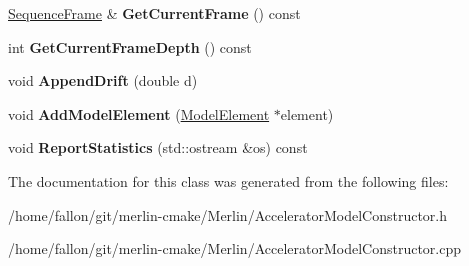 \begin{DoxyCompactItemize}
\item 
\mbox{\label{classAcceleratorModelConstructor_afe1516820679d7d820f264ee0740921f}} 
\hyperlink{classSequenceFrame}{Sequence\+Frame} \& {\bfseries Get\+Current\+Frame} () const
\item 
\mbox{\label{classAcceleratorModelConstructor_a86180838de0ec075c0a009da4ba3535c}} 
int {\bfseries Get\+Current\+Frame\+Depth} () const
\item 
\mbox{\label{classAcceleratorModelConstructor_a6c138a047f21536500eae4cf3ae918cf}} 
void {\bfseries Append\+Drift} (double d)
\item 
\mbox{\label{classAcceleratorModelConstructor_a8a49d3c29c1b4cd57e71e14d1f766688}} 
void {\bfseries Add\+Model\+Element} (\hyperlink{classModelElement}{Model\+Element} $\ast$element)
\item 
\mbox{\label{classAcceleratorModelConstructor_a18134efe6ac33c9071083502e2d3ac2e}} 
void {\bfseries Report\+Statistics} (std\+::ostream \&os) const
\end{DoxyCompactItemize}


The documentation for this class was generated from the following files\+:\begin{DoxyCompactItemize}
\item 
/home/fallon/git/merlin-\/cmake/\+Merlin/Accelerator\+Model\+Constructor.\+h\item 
/home/fallon/git/merlin-\/cmake/\+Merlin/Accelerator\+Model\+Constructor.\+cpp\end{DoxyCompactItemize}
